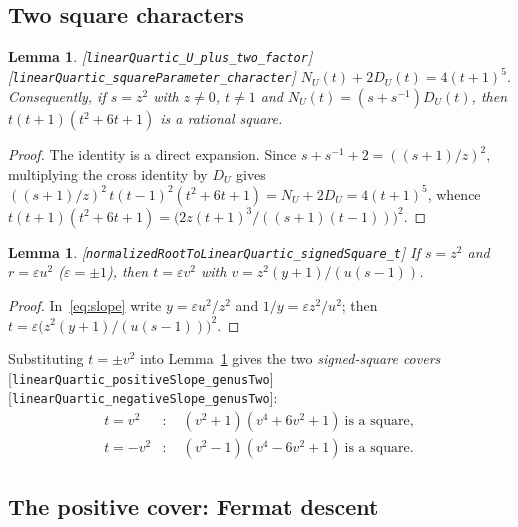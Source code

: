 \documentclass[10pt]{article}
\newtheorem{lemma}[theorem]{Lemma}
\theoremstyle{definition}
\theoremstyle{remark}
\newcommand{\leanref}[1]{{\scriptsize\textup{[\texttt{#1}]}}\allowbreak}
\begin{document}
\subsection{Two square characters}

\begin{lemma}\label{lem:char1}
\leanref{linear\allowbreak Quartic\_\allowbreak U\_\allowbreak plus\_\allowbreak two\_\allowbreak factor} \leanref{linear\allowbreak Quartic\_\allowbreak square\allowbreak Parameter\_\allowbreak character}
$N_U(t)+2D_U(t)=4(t+1)^5$.  Consequently, if $s=z^2$ with $z\ne0$, $t\ne1$
and $N_U(t)=(s+s^{-1})D_U(t)$, then $t(t+1)(t^2+6t+1)$ is a rational square.
\end{lemma}

\begin{proof}
The identity is a direct expansion.  Since $s+s^{-1}+2=((s+1)/z)^2$,
multiplying the cross identity by $D_U$ gives
$((s+1)/z)^2\,t(t-1)^2(t^2+6t+1)=N_U+2D_U=4(t+1)^5$, whence
$t(t+1)(t^2+6t+1)=\bigl(2z(t+1)^3/((s+1)(t-1))\bigr)^2$.
\end{proof}

\begin{lemma}\label{lem:char2}
\leanref{normalized\allowbreak Root\allowbreak To\allowbreak Linear\allowbreak Quartic\_\allowbreak signed\allowbreak Square\_\allowbreak t}
If $s=z^2$ and $r=\varepsilon u^2$ ($\varepsilon=\pm1$), then
$t=\varepsilon v^2$ with $v=z^2(y+1)/(u(s-1))$.
\end{lemma}

\begin{proof}
In~\eqref{eq:slope} write $y=\varepsilon u^2/z^2$ and $1/y=\varepsilon z^2/u^2$;
then $t=\varepsilon\bigl(z^2(y+1)/(u(s-1))\bigr)^2$.
\end{proof}

Substituting $t=\pm v^2$ into Lemma~\ref{lem:char1} gives the two
\emph{signed-square covers}
\leanref{linear\allowbreak Quartic\_\allowbreak positive\allowbreak Slope\_\allowbreak genus\allowbreak Two} \leanref{linear\allowbreak Quartic\_\allowbreak negative\allowbreak Slope\_\allowbreak genus\allowbreak Two}:
\begin{align}
 t=v^2&:\quad (v^2+1)(v^4+6v^2+1)\ \text{is a square},\label{eq:Dplus}\\
 t=-v^2&:\quad (v^2-1)(v^4-6v^2+1)\ \text{is a square}.\label{eq:Dminus}
\end{align}

\subsection{The positive cover: Fermat descent}
\end{document}
